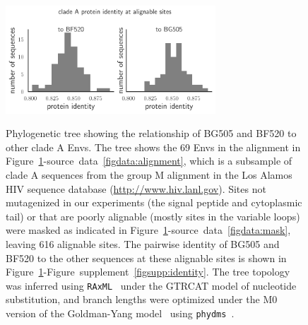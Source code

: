\documentclass[9pt]{elife}
\begin{document}
\begin{figure}
\caption{\label{fig:tree}
Phylogenetic tree showing the relationship of BG505 and BF520 to other clade A Envs.
The tree shows the 69 Envs in the alignment in Figure~\ref{fig:tree}-source~data~\ref{figdata:alignment}, which is a subsample of clade A sequences from the group M alignment in the Los Alamos HIV sequence database (\url{http://www.hiv.lanl.gov}).
Sites not mutagenized in our experiments (the signal peptide and cytoplasmic tail) or that are poorly alignable (mostly sites in the variable loops) were masked as indicated in Figure~\ref{fig:tree}-source~data~\ref{figdata:mask}, leaving 616 alignable sites.
The pairwise identity of BG505 and BF520 to the other sequences at these alignable sites is shown in Figure~\ref{fig:tree}-Figure~supplement~\ref{figsupp:identity}.
The tree topology was inferred using \texttt{RAxML}~\citep{stamatakis2014raxml} under the GTRCAT model of nucleotide substitution, and branch lengths were optimized under the M0 version of the Goldman-Yang model~\citep{yang2000codon} using \texttt{phydms}~\citep{hilton2017phydms}.
}
{\includegraphics[width=0.7\textwidth]{figures/masked_alignment_identity.pdf}}
\end{figure}
\end{document}
